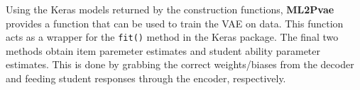 Using the Keras models returned by the construction functions, \textbf{ML2Pvae} provides a function that can be used to train the VAE on data. This function acts as a wrapper for the \verb!fit()! method in the Keras package. The final two methods obtain item paremeter estimates and student ability parameter estimates. This is done by grabbing the correct weights/biases from the decoder and feeding student responses through the encoder, respectively. 

